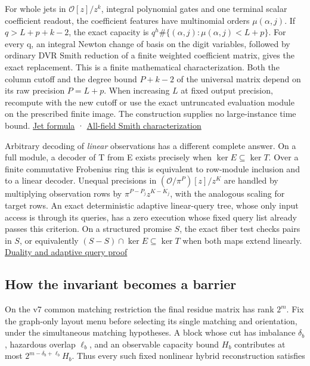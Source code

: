 \documentclass[
  11pt,
]{article}
\begin{document}
For whole jets in \(\mathcal O[z]/z^k\), integral polynomial gates and
one terminal scalar coefficient readout, the coefficient features have
multinomial orders \(\mu(\alpha,j)\). If \(q>L+p+k-2\), the exact
capacity is \(q^h\#\{(\alpha,j):\mu(\alpha,j)<L+p\}\). For every q, an
integral Newton change of basis on the digit variables, followed by
ordinary DVR Smith reduction of a finite weighted coefficient matrix,
gives the exact replacement. This is a finite mathematical
characterization. Both the column cutoff and the degree bound \(P+k-2\)
of the universal matrix depend on its raw precision \(P=L+p\). When
increasing \(L\) at fixed output precision, recompute with the new
cutoff or use the exact untruncated evaluation module on the prescribed
finite image. The construction supplies no large-instance time bound.
\hyperref[v8-section-jet-polynomial-capacity]{Jet formula} ·
\hyperref[v8-section-jet-newton-smith]{All-field Smith characterization}

Arbitrary decoding of \emph{linear} observations has a different
complete answer. On a full module, a decoder of T from E exists
precisely when \(\ker E\subseteq\ker T\). Over a finite commutative
Frobenius ring this is equivalent to row-module inclusion and to a
linear decoder. Unequal precisions in \((\mathcal O/\pi^P)[z]/z^K\) are
handled by multiplying observation rows by \(\pi^{P-P_j}z^{K-K_j}\),
with the analogous scaling for target rows. An exact deterministic
adaptive linear-query tree, whose only input access is through its
queries, has a zero execution whose fixed query list already passes this
criterion. On a structured promise \(S\), the exact fiber test checks
pairs in \(S\), or equivalently \((S-S)\cap\ker E\subseteq\ker T\) when
both maps extend linearly. \hyperref[v8-section-duality-typeset]{Duality
and adaptive query proof}

\subsection{How the invariant becomes a
barrier}\label{v8-how-the-invariant-becomes-a-barrier}

On the v7 common matching restriction the final residue matrix has rank
\(2^m\). Fix the graph-only layout menu before selecting its single
matching and orientation, under the simultaneous matching hypotheses. A
block whose cut has imbalance \(\delta_b\), hazardous overlap
\(\ell_b\), and an observable capacity bound \(H_b\) contributes at most
\(2^{m-\delta_b+\ell_b}H_b\). Thus every such fixed nonlinear hybrid
reconstruction satisfies
\end{document}
